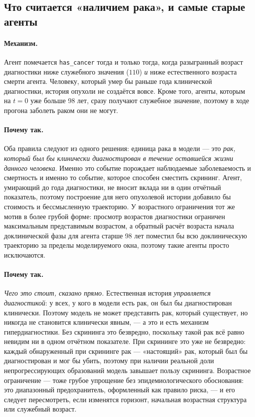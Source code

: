 \documentclass[12pt,a4paper]{article}
\newcommand{\id}[1]{\texttt{#1}}
\newcommand{\mech}[1]{\paragraph{Механизм.} #1}
\newcommand{\why}[1]{\paragraph{Почему так.} #1}
\begin{document}
\subsection{Что считается «наличием рака», и самые старые агенты}

\mech{Агент помечается \id{has\_cancer} тогда и только тогда, когда разыгранный возраст диагностики ниже
служебного значения ($110$) \emph{и} ниже естественного возраста смерти агента. Человеку, который умер бы
раньше года клинической диагностики, история опухоли не создаётся вовсе. Кроме того, агенты, которым на
$t=0$ уже больше 98 лет, сразу получают служебное значение, поэтому в ходе прогона заболеть раком они не
могут.}

\why{Оба правила следуют из одного решения: единица рака в модели --- это \emph{рак, который был бы
клинически диагностирован в течение оставшейся жизни данного человека}. Именно это событие порождает
наблюдаемые заболеваемость и смертность и именно то событие, которое способен сместить скрининг. Агент,
умирающий до года диагностики, не вносит вклада ни в один отчётный показатель, поэтому построение для него
опухолевой истории добавило бы стоимость и бессмысленную траекторию. У возрастного ограничения тот же
мотив в более грубой форме: просмотр возрастов диагностики ограничен максимальным представимым возрастом, а
обратный расчёт возраста начала доклинической фазы для агента старше 98 лет поместил бы всю доклиническую
траекторию за пределы моделируемого окна, поэтому такие агенты просто исключаются.}

\why{\emph{Чего это стоит, сказано прямо.} Естественная история \emph{управляется диагностикой}: у всех,
у кого в модели есть рак, он был бы диагностирован клинически. Поэтому модель не может представить рак,
который существует, но никогда не становится клинически явным, --- а это и есть механизм гипердиагностики.
Без скрининга это безвредно, поскольку такой рак всё равно невидим ни в одном отчётном показателе. При
скрининге это уже не безвредно: каждый обнаруженный при скрининге рак --- «настоящий» рак, который был бы
диагностирован и мог бы убить, поэтому при наличии реальной доли непрогрессирующих образований модель
завышает пользу скрининга. Возрастное ограничение --- тоже грубое упрощение без эпидемиологического
обоснования: это диапазонный предохранитель, оформленный как правило риска, --- и его следует пересмотреть,
если изменятся горизонт, начальная возрастная структура или служебный возраст.}
\end{document}
